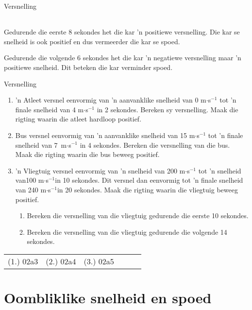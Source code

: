 \begin{wex}{Versnelling}
{\begin{minipage}[t]{0.5\textwidth}
\end{minipage}\\
Gedurende die eerste 8 sekondes het die kar 'n positiewe versnelling. Die kar se snelheid is ook positief en dus vermeerder die kar se spoed.\par
Gedurende die volgende 6 sekondes het die kar 'n negatiewe versnelling maar 'n positiewe snelheid. Dit beteken die kar verminder spoed.
}
\end{wex}


\begin{exercises}{Versnelling}
      
\noindent
\begin{enumerate}[noitemsep, label=\textbf{\arabic*}. ] 
    \item 'n Atleet versnel eenvormig van 'n aanvanklike snelheid van 0 m$\ensuremath{\cdot}$s${}^{-1}$ tot 'n finale snelheid van 4 m$\ensuremath{\cdot}$s${}^{-1}$ in 2 sekondes. Bereken sy versnelling. Maak die rigting waarin die atleet hardloop positief.    
    \item \n Bus versnel eenvormig van 'n aanvanklike snelheid van 15 m$\ensuremath{\cdot}$s${}^{-1}$ tot 'n finale snelheid van 7~m$\ensuremath{\cdot}$s${}^{-1}$ in 4 sekondes. Bereken die versnelling van die bus. Maak die rigting waarin die bus beweeg positief.

    \item 'n Vliegtuig versnel eenvormig van 'n snelheid van 200 m$\ensuremath{\cdot}$s${}^{-1}$ tot 'n snelheid van100 m$\ensuremath{\cdot}$s${}^{-1}$in 10 sekondes. Dit versnel dan eenvormig tot 'n finale snelheid van 240 m$\ensuremath{\cdot}$s${}^{-1}$in 20 sekondes. Maak die rigting waarin die vliegtuig beweeg positief.
 
    \begin{enumerate}[noitemsep, label=\textbf{\alph*}. ] 
            \item Bereken die versnelling van die vliegtuig gedurende die eerste 10 sekondes.
            \item Bereken die versnelling van die vliegtuig gedurende die volgende 14 sekondes.
    \end{enumerate}
\end{enumerate}
\practiceinfo
\par \begin{tabular}[h]{cccccc}
(1.) 02a3  &  (2.) 02a4  &  (3.) 02a5  & \end{tabular}
\end{exercises}


\section{Oombliklike snelheid en spoed}


